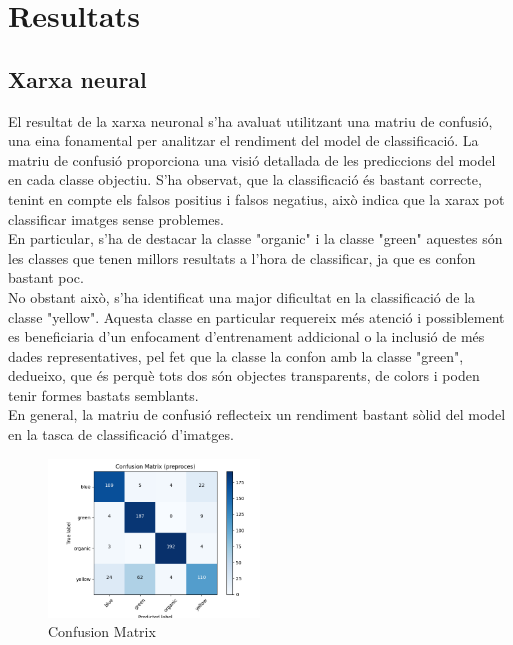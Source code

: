 ﻿\documentclass[10pt,a4paper,twocolumn,twoside]{article}
\begin{document}
\section{Resultats}
\subsection{Xarxa neural}

El resultat de la xarxa neuronal s'ha avaluat utilitzant una matriu de confusió, una eina fonamental per analitzar el rendiment del model de classificació. La matriu de confusió proporciona una visió detallada de les prediccions del model en cada classe objectiu. S'ha observat, que la classificació és bastant correcte, tenint en compte els falsos positius i falsos negatius, això indica que la xarax pot classificar imatges sense problemes.
\\

En particular, s'ha de destacar la classe "organic" i la classe "green" aquestes són les classes que tenen millors resultats a l'hora de classificar, ja que es confon bastant poc.
\\

No obstant això, s'ha identificat una major dificultat en la classificació de la classe "yellow". Aquesta classe en particular requereix més atenció i possiblement es beneficiaria d'un enfocament d'entrenament addicional o la inclusió de més dades representatives, pel fet que la classe la confon amb la classe "green", dedueixo, que és perquè tots dos són objectes transparents, de colors i poden tenir formes bastats semblants.
\\

En general, la matriu de confusió reflecteix un rendiment bastant sòlid del model en la tasca de classificació d'imatges.

 \begin{figure}[!h]
 \centering
    \includegraphics[width=0.5\textwidth]{img/ConfusionMatrix.png}
    \caption{Confusion Matrix}
\end{figure}
 \hfill \break
\end{document}
